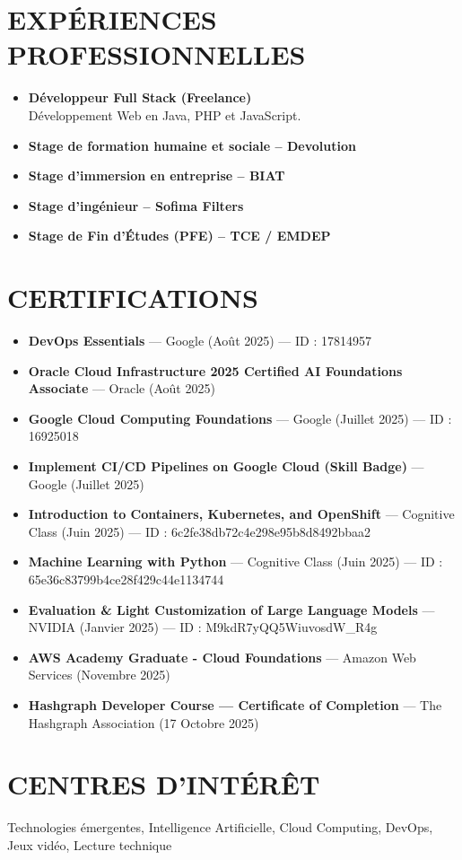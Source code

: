 \documentclass[paper=a4,fontsize=11pt]{scrartcl}
\newcommand{\sepspace}{\vspace*{0.5em}}
\newcommand{\NewPart}[1]{\section*{\uppercase{#1}}}
\begin{document}
\sepspace

\NewPart{Expériences Professionnelles}
\begin{itemize}

    \item \textbf{Développeur Full Stack (Freelance)} \\
    Développement Web en Java, PHP et JavaScript.

    \item \textbf{Stage de formation humaine et sociale – Devolution}

    \item \textbf{Stage d’immersion en entreprise – BIAT}

    \item \textbf{Stage d’ingénieur – Sofima Filters}
    \item \textbf{Stage de Fin d’Études (PFE) – TCE / EMDEP} \\

\end{itemize}

\sepspace



\NewPart{Certifications}
\begin{itemize}
    \item \textbf{DevOps Essentials} — Google (Août 2025) — ID : 17814957
    \item \textbf{Oracle Cloud Infrastructure 2025 Certified AI Foundations Associate} — Oracle (Août 2025)
    \item \textbf{Google Cloud Computing Foundations} — Google (Juillet 2025) — ID : 16925018
    \item \textbf{Implement CI/CD Pipelines on Google Cloud (Skill Badge)} — Google (Juillet 2025)
    \item \textbf{Introduction to Containers, Kubernetes, and OpenShift} — Cognitive Class (Juin 2025) — ID : 6c2fe38db72c4e298e95b8d8492bbaa2
    \item \textbf{Machine Learning with Python} — Cognitive Class (Juin 2025) — ID : 65e36c83799b4ce28f429c44e1134744
    \item \textbf{Evaluation \& Light Customization of Large Language Models} — NVIDIA (Janvier 2025) — ID : M9kdR7yQQ5WiuvosdW\_R4g
    \item \textbf{AWS Academy Graduate - Cloud Foundations} — Amazon Web Services (Novembre 2025)
    \item \textbf{Hashgraph Developer Course — Certificate of Completion} — The Hashgraph Association (17 Octobre 2025)
\end{itemize}

\sepspace

\NewPart{Centres d'intérêt}
\noindent
Technologies émergentes, Intelligence Artificielle, Cloud Computing, DevOps, Jeux vidéo, Lecture technique
\end{document}

